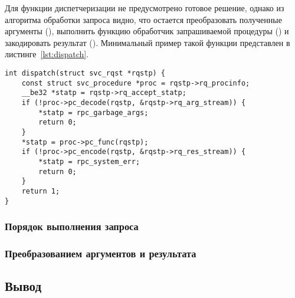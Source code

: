 Для функции диспетчеризации не предусмотрено готовое решение, однако из
алгоритма обработки запроса видно, что остается преобразовать полученные
аргументы (), выполнить функцию обработчик запрашиваемой
процедуры () и закодировать результат ().
Минимальный пример такой функции представлен в листинге~\ref{lst:dispatch}.

\begin{lstlisting}[caption={Минимальная реализация функции диспетчеризации}, label={lst:dispatch}]
int dispatch(struct svc_rqst *rqstp) {
    const struct svc_procedure *proc = rqstp->rq_procinfo;
    __be32 *statp = rqstp->rq_accept_statp;
    if (!proc->pc_decode(rqstp, &rqstp->rq_arg_stream)) {
        *statp = rpc_garbage_args;
        return 0;
    }
    *statp = proc->pc_func(rqstp);
    if (!proc->pc_encode(rqstp, &rqstp->rq_res_stream)) {
        *statp = rpc_system_err;
        return 0;
    }
    return 1;
}
\end{lstlisting}

\subsubsection{Порядок выполнения запроса}

\subsubsection{Преобразованием аргументов и результата}

\subsection*{Вывод}

